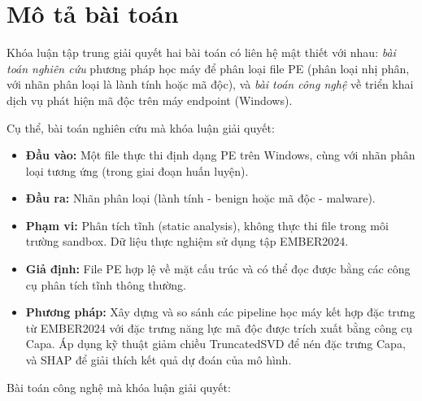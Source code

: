 \section*{Mô tả bài toán}

Khóa luận tập trung giải quyết hai bài toán có liên hệ mật thiết với
nhau: \textit{bài toán nghiên cứu} phương pháp học máy để phân loại file
PE (phân loại nhị phân, với nhãn phân loại là lành tính hoặc mã độc),
và \textit{bài toán công nghệ} về triển khai dịch vụ phát hiện mã độc trên
máy endpoint (Windows).

Cụ thể, bài toán nghiên cứu mà khóa luận giải quyết:

\begin{itemize}
    \item \textbf{Đầu vào:} Một file thực thi định dạng PE trên Windows,
        cùng với nhãn phân loại tương ứng (trong giai đoạn huấn luyện).
    \item \textbf{Đầu ra:} Nhãn phân loại (lành tính - benign hoặc
        mã độc - malware).
    \item \textbf{Phạm vi:} Phân tích tĩnh (static analysis), không
        thực thi file trong môi trường sandbox. Dữ liệu thực nghiệm sử
        dụng tập EMBER2024.
    \item \textbf{Giả định:} File PE hợp lệ về mặt cấu trúc và có thể
        đọc được bằng các công cụ phân tích tĩnh thông thường.
    \item \textbf{Phương pháp:} Xây dựng và so sánh các pipeline học
        máy kết hợp đặc trưng từ EMBER2024 với đặc trưng năng lực mã
        độc được trích xuất bằng công cụ Capa. Áp dụng kỹ thuật giảm
        chiều TruncatedSVD để nén đặc trưng Capa, và SHAP để giải thích
        kết quả dự đoán của mô hình.
\end{itemize}

Bài toán công nghệ mà khóa luận giải quyết:


